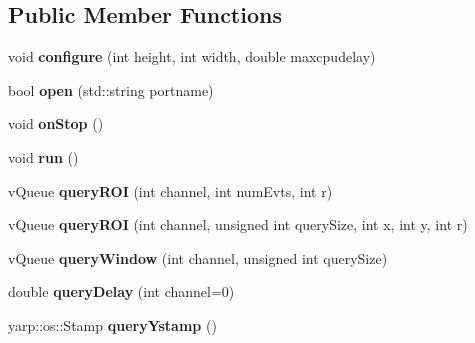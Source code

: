 \subsection*{Public Member Functions}
\begin{DoxyCompactItemize}
\item 
void {\bfseries configure} (int height, int width, double maxcpudelay)\hypertarget{classev_1_1hSurfThread_a17acb3eb05f063ab81ab5128986ed7c8}{}\label{classev_1_1hSurfThread_a17acb3eb05f063ab81ab5128986ed7c8}

\item 
bool {\bfseries open} (std\+::string portname)\hypertarget{classev_1_1hSurfThread_afa2fc93ae2c64231e566738ebfddabf1}{}\label{classev_1_1hSurfThread_afa2fc93ae2c64231e566738ebfddabf1}

\item 
void {\bfseries on\+Stop} ()\hypertarget{classev_1_1hSurfThread_a7897b02f77738563c0d2fd5123dc4c51}{}\label{classev_1_1hSurfThread_a7897b02f77738563c0d2fd5123dc4c51}

\item 
void {\bfseries run} ()\hypertarget{classev_1_1hSurfThread_af4a0a8b35321419785dce1b94e43e5e3}{}\label{classev_1_1hSurfThread_af4a0a8b35321419785dce1b94e43e5e3}

\item 
v\+Queue {\bfseries query\+R\+OI} (int channel, int num\+Evts, int r)\hypertarget{classev_1_1hSurfThread_a469e52e39fe123a6699171e504cf0e78}{}\label{classev_1_1hSurfThread_a469e52e39fe123a6699171e504cf0e78}

\item 
v\+Queue {\bfseries query\+R\+OI} (int channel, unsigned int query\+Size, int x, int y, int r)\hypertarget{classev_1_1hSurfThread_ada4a11e319f5f0122897e21d6411bb1a}{}\label{classev_1_1hSurfThread_ada4a11e319f5f0122897e21d6411bb1a}

\item 
v\+Queue {\bfseries query\+Window} (int channel, unsigned int query\+Size)\hypertarget{classev_1_1hSurfThread_a89e485321978fdf785ba0e4e3b08a7ec}{}\label{classev_1_1hSurfThread_a89e485321978fdf785ba0e4e3b08a7ec}

\item 
double {\bfseries query\+Delay} (int channel=0)\hypertarget{classev_1_1hSurfThread_ae50c10e866f8692aae342d75e38369e7}{}\label{classev_1_1hSurfThread_ae50c10e866f8692aae342d75e38369e7}

\item 
yarp\+::os\+::\+Stamp {\bfseries query\+Ystamp} ()\hypertarget{classev_1_1hSurfThread_a02f2a70c6f8147e70e1689520555c389}{}\label{classev_1_1hSurfThread_a02f2a70c6f8147e70e1689520555c389}


\end{DoxyCompactItemize}

